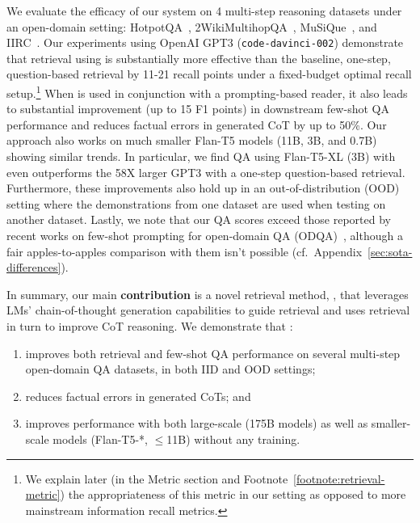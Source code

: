 We evaluate the efficacy of our system on 4 multi-step reasoning datasets under an open-domain setting: HotpotQA~\cite{hotpotqa}, 2WikiMultihopQA~\cite{xanh2020_2wikimultihop}, MuSiQue~\cite{musique}, and IIRC~\cite{iirc}. Our experiments using OpenAI GPT3 (\texttt{code-davinci-002}) \cite{originalgpt3,instructgpt3,codex} demonstrate that retrieval using \iconsys is substantially more effective than the baseline, one-step, question-based retrieval by 11-21 recall points under a fixed-budget optimal recall setup.\footnote{We explain later (in the Metric section and Footnote~\ref{footnote:retrieval-metric}) the appropriateness of this metric in our setting as opposed to more mainstream information recall metrics.} When \iconsys is used in conjunction with a prompting-based reader, it also leads to substantial improvement (up to 15 F1 points) in downstream few-shot QA performance and reduces factual errors in generated CoT by up to 50\%. Our approach also works on much smaller Flan-T5 models (11B, 3B, and 0.7B) showing similar trends. In particular, we find QA using Flan-T5-XL (3B) with \iconsys even outperforms the 58X larger GPT3 with a one-step question-based retrieval.
Furthermore, these improvements also hold up in an out-of-distribution (OOD) setting where the demonstrations from one dataset are used when testing on another dataset.
Lastly, we note that our QA scores exceed those reported by recent works on few-shot prompting for open-domain QA (ODQA)~\cite{decomp,selfask,react}, although a fair apples-to-apples comparison with them isn't possible (cf.~Appendix~\ref{sec:sota-differences}).

In summary, our main \textbf{contribution} is a novel retrieval method, \iconsys, that leverages LMs' chain-of-thought generation capabilities to guide retrieval and uses retrieval in turn to improve CoT reasoning. We demonstrate that \iconsys:
%
\begin{enumerate}[nosep]

    \item improves both retrieval and few-shot QA performance on several multi-step open-domain QA datasets, in both IID and OOD settings;

    \item reduces factual errors in generated CoTs; and

    \item improves performance with both large-scale (175B models) as well as smaller-scale models (Flan-T5-*, $\le$11B) without any training.

\end{enumerate}
